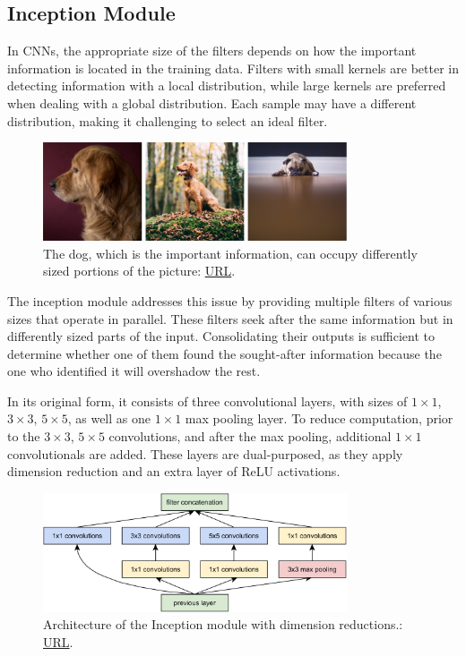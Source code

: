 \subsection{Inception Module}
In CNNs, the appropriate size of the filters depends on how the important information is located in the training data. Filters with small kernels are better in detecting information with a local distribution, while large kernels are preferred when dealing with a global distribution. Each sample may have a different distribution, making it challenging to select an ideal filter.
\begin{figure}[H]
    \centering
        \includegraphics[width=0.8\textwidth]{Images/dogs_inception.jpg}
        \decoRule
        \caption[Variety of distribution of information.]{The dog, which is the important information, can occupy differently sized portions of the picture: \href{https://towardsdatascience.com/a-simple-guide-to-the-versions-of-the-inception-network-7fc52b863202}{URL}.}
        \label{fig:dogs_inception}
\end{figure}

The inception module \cite{inception_module} addresses this issue by providing multiple filters of various sizes that operate in parallel. These filters seek after the same information but in differently sized parts of the input. Consolidating their outputs is sufficient to determine whether one of them found the sought-after information because the one who identified it will overshadow the rest.

In its original form, it consists of three convolutional layers, with sizes of \(1\times1\), \(3\times3\), \(5\times5\), as well as one \(1\times1\) max pooling layer. To reduce computation, prior to the \(3\times3\), \(5\times5\) convolutions, and after the max pooling, additional \(1\times1\) convolutionals are added. These layers are dual-purposed, as they apply dimension reduction and an extra layer of ReLU activations.

\begin{figure}[H]
    \centering
        \includegraphics[width=0.8\textwidth]{Images/ANNArchitectures/inception_module.png}
        \decoRule
        \caption[Inception Module]{Architecture of the Inception module with dimension reductions.: \href{https://arxiv.org/abs/1409.4842}{URL}.}
        \label{fig:inception}
\end{figure}

